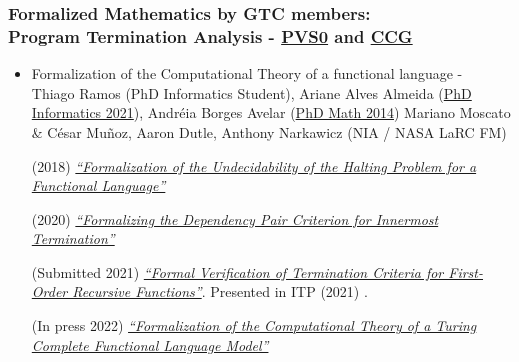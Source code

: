 \documentclass[10pt]{beamer}
\begin{document}
\begin{frame}[fragile]
  \frametitle{Formalized Mathematics by GTC members:\\
   Program Termination Analysis -
   \href{https://github.com/nasa/pvslib/tree/master/PVS0}{\color{blue} PVS0} and  \href{https://github.com/nasa/pvslib/tree/master/CCG}{\color{blue} CCG}}

{\small
\begin{itemize}

\item Formalization of the Computational Theory of a functional
  language - \\ Thiago Ramos (PhD Informatics Student),
  Ariane Alves
  Almeida (\href{https://repositorio.unb.br/handle/10482/42296}{\color{blue}PhD Informatics 2021}), Andr\'eia Borges Avelar (\href{https://repositorio.unb.br/handle/10482/18069}{\color{blue}PhD Math  2014})
  Mariano Moscato \& C\'esar Mu\~noz, Aaron Dutle, Anthony Narkawicz  (NIA / NASA LaRC FM)

 (2018)  \href{https://doi.org/10.1007/978-3-662-57669-4}{\color{blue}\scriptsize\it ``Formalization of the Undecidability of the Halting Problem for a Functional Language''}


  (2020) \href{https://doi.org/10.1016/j.scico.2020.102474}{\color{blue}\scriptsize\it ``Formalizing the Dependency Pair Criterion for Innermost Termination''}   

 (Submitted 2021)  \href{https://doi.org/10.4230/LIPIcs.ITP.2021.27}{\color{blue}\scriptsize\it
    ``Formal Verification of Termination Criteria for First-Order
    Recursive Functions''}. Presented in 
  ITP  (2021) . 

  (In press 2022) \href{https://doi.org/10.1007/s10817-021-09615-x}{\color{blue}\scriptsize\it
    ``Formalization of the Computational Theory of a Turing Complete Functional Language Model''} 

\end{itemize}
}  

\end{frame}
\end{document}
